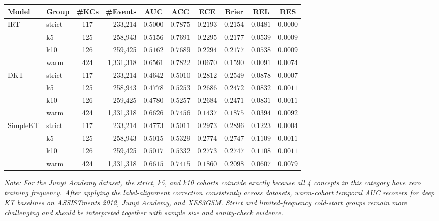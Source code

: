 \begin{tableorg}[htbp]
\begin{tabular}{llcrcccccc}
\toprule
Model & Group & \#KCs & \#Events & AUC & ACC & ECE & Brier & REL & RES \\
\midrule
IRT & strict & 117 & 233,214 & $0.5000$ & $0.7875$ & $0.2193$ & $0.2154$ & $0.0481$ & $0.0000$ \\
 & k5 & 125 & 258,943 & $0.5156$ & $0.7691$ & $0.2295$ & $0.2177$ & $0.0539$ & $0.0009$ \\
 & k10 & 126 & 259,425 & $0.5162$ & $0.7689$ & $0.2294$ & $0.2177$ & $0.0538$ & $0.0009$ \\
 & warm & 424 & 1,331,318 & $0.6561$ & $0.7822$ & $0.0670$ & $0.1590$ & $0.0091$ & $0.0074$ \\
\midrule
DKT & strict & 117 & 233,214 & $0.4642$ & $0.5010$ & $0.2812$ & $0.2549$ & $0.0878$ & $0.0007$ \\
 & k5 & 125 & 258,943 & $0.4778$ & $0.5253$ & $0.2686$ & $0.2472$ & $0.0832$ & $0.0011$ \\
 & k10 & 126 & 259,425 & $0.4780$ & $0.5257$ & $0.2684$ & $0.2471$ & $0.0831$ & $0.0011$ \\
 & warm & 424 & 1,331,318 & $0.6626$ & $0.7456$ & $0.1437$ & $0.1875$ & $0.0394$ & $0.0092$ \\
\midrule
SimpleKT & strict & 117 & 233,214 & $0.4773$ & $0.5011$ & $0.2973$ & $0.2896$ & $0.1223$ & $0.0004$ \\
 & k5 & 125 & 258,943 & $0.5015$ & $0.5329$ & $0.2774$ & $0.2747$ & $0.1109$ & $0.0011$ \\
 & k10 & 126 & 259,425 & $0.5017$ & $0.5332$ & $0.2773$ & $0.2747$ & $0.1108$ & $0.0011$ \\
 & warm & 424 & 1,331,318 & $0.6615$ & $0.7415$ & $0.1860$ & $0.2098$ & $0.0607$ & $0.0079$ \\
\bottomrule
\end{tabular}

\vspace{1ex}
\noindent\footnotesize \textit{Note: For the Junyi Academy dataset, the strict, k5, and k10 cohorts coincide exactly because all 4 concepts in this category have zero training frequency. After applying the label-alignment correction consistently across datasets, warm-cohort temporal AUC recovers for deep KT baselines on ASSISTments 2012, Junyi Academy, and XES3G5M. Strict and limited-frequency cold-start groups remain more challenging and should be interpreted together with sample size and sanity-check evidence.}

\end{tableorg}

